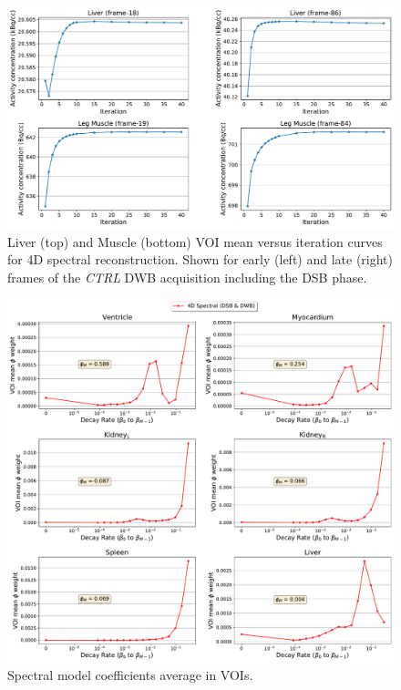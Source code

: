\begin{figure} [h!]
\centering
\includegraphics[scale=0.5,angle=0]{3_Results/3_3_DWB_Reconstruction/figures/3_3_IsotoPK_CTRL_DWB_4D_Convergence.pdf}
\caption{Liver (top) and Muscle (bottom) VOI mean versus iteration curves for 4D spectral reconstruction. Shown for early (left) and late (right) frames of the \textit{CTRL} DWB acquisition including the DSB phase.}
\label{fig_3_3:IsotoPK_CTRL_DSB_3D_Convergence}
\end{figure} 


\begin{figure} [h!]
\centering
\includegraphics[scale=0.48,angle=0]{3_Results/3_3_DWB_Reconstruction/figures/3_3_IsotoPK_CTRL_DWB_SpectralParams_central_.pdf}
\caption{Spectral model coefficients average in VOIs.}
\label{fig_3_3:IsotoPK_CTRL_DWB_Spectrals}
\end{figure} 

